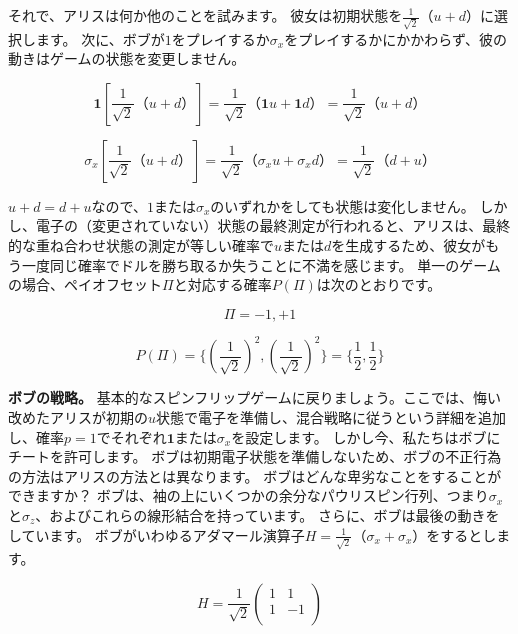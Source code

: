 それで、アリスは何か他のことを試みます。 彼女は初期状態を$\frac{1}{\sqrt{2}}（u+d）$に選択します。
次に、ボブが$1$をプレイするか$\sigma_x$をプレイするかにかかわらず、彼の動きはゲームの状態を変更しません。

\begin{equation}
\label{28}
\textbf{1} [   \frac{1}{\sqrt{2}}（u+d）]
=
\frac{1}{\sqrt{2}}（\textbf{1} u + \textbf{1}d）
=
\frac{1}{\sqrt{2}}（u+d）
\end{equation}

\begin{equation}
\label{29}
\sigma_x [ \frac{1}{\sqrt{2}}（u+d）]
=
\frac{1}{\sqrt{2}}（\sigma_x u + \sigma_x d）
=
\frac{1}{\sqrt{2}}（d + u）
\end{equation}

$u + d = d + u$なので、$1$または$\sigma_x$のいずれかをしても状態は変化しません。
しかし、電子の（変更されていない）状態の最終測定が行われると、アリスは、最終的な重ね合わせ状態の測定が等しい確率で$u$または$d$を生成するため、彼女がもう一度同じ確率でドルを勝ち取るか失うことに不満を感じます。
単一のゲームの場合、ペイオフセット$\Pi$と対応する確率$P(\Pi)$は次のとおりです。


\begin{equation}
\label{30}
\Pi = {-1, +1}
\end{equation}

\begin{equation}
\label{31}
P(\Pi) = \{ ( \frac{1}{\sqrt{2}} )^2, ( \frac{1}{\sqrt{2}} )^2 \} 
= \{ \frac{1}{2}, \frac{1}{2} \}
\end{equation}

\textbf{ボブの戦略。}
基本的なスピンフリップゲームに戻りましょう。ここでは、悔い改めたアリスが初期の$u$状態で電子を準備し、混合戦略に従うという詳細を追加し、確率$p = 1$でそれぞれ$\textbf{1}$または$\sigma_x$を設定します。
しかし今、私たちはボブにチートを許可します。 ボブは初期電子状態を準備しないため、ボブの不正行為の方法はアリスの方法とは異なります。
ボブはどんな卑劣なことをすることができますか？ ボブは、袖の上にいくつかの余分なパウリスピン行列、つまり$\sigma_x$と$\sigma_z$、およびこれらの線形結合を持っています。
さらに、ボブは最後の動きをしています。 ボブがいわゆるアダマール演算子$H = \frac{1}{\sqrt{2}}（\sigma_x + \sigma_x ）$をするとします。

\begin{equation}
\label{32}
H = \frac{1}{\sqrt{2}}
\begin{pmatrix}
1 & 1 \\
1 & -1 \\
\end{pmatrix}
\end{equation}

